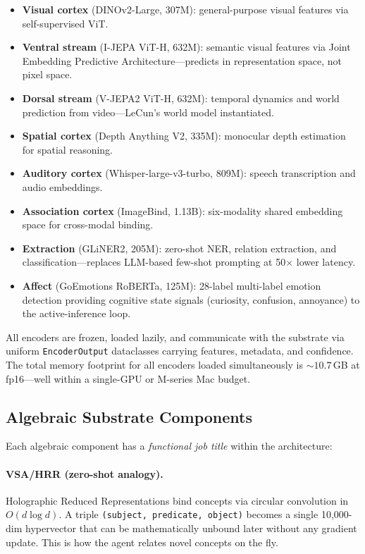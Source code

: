 \begin{itemize}[nosep]
  \item \textbf{Visual cortex} (DINOv2-Large, 307M): general-purpose visual
    features via self-supervised ViT.
  \item \textbf{Ventral stream} (I-JEPA ViT-H, 632M): semantic visual features
    via Joint Embedding Predictive Architecture---predicts in representation
    space, not pixel space.
  \item \textbf{Dorsal stream} (V-JEPA2 ViT-H, 632M): temporal dynamics and
    world prediction from video---LeCun's world model instantiated.
  \item \textbf{Spatial cortex} (Depth Anything V2, 335M): monocular depth
    estimation for spatial reasoning.
  \item \textbf{Auditory cortex} (Whisper-large-v3-turbo, 809M): speech
    transcription and audio embeddings.
  \item \textbf{Association cortex} (ImageBind, 1.13B): six-modality shared
    embedding space for cross-modal binding.
  \item \textbf{Extraction} (GLiNER2, 205M): zero-shot NER, relation extraction,
    and classification---replaces LLM-based few-shot prompting at 50$\times$
    lower latency.
  \item \textbf{Affect} (GoEmotions RoBERTa, 125M): 28-label multi-label emotion
    detection providing cognitive state signals (curiosity, confusion,
    annoyance) to the active-inference loop.
\end{itemize}

All encoders are frozen, loaded lazily, and communicate with the substrate via
uniform \texttt{EncoderOutput} dataclasses carrying features, metadata, and
confidence.  The total memory footprint for all encoders loaded simultaneously is
${\sim}10.7$\,GB at fp16---well within a single-GPU or M-series Mac budget.

\subsection{Algebraic Substrate Components}

Each algebraic component has a \emph{functional job title} within the
architecture:

\paragraph{VSA/HRR (zero-shot analogy).}
Holographic Reduced Representations bind concepts via circular convolution in
$O(d \log d)$.  A triple \texttt{(subject, predicate, object)} becomes a single
10,000-dim hypervector that can be mathematically unbound later without any
gradient update.  This is how the agent relates novel concepts on the fly.

